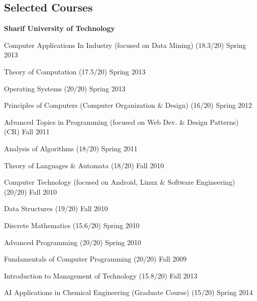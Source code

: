 \documentclass[margin,line]{resume}
\begin{document}
\begin{resume}
     \section{\mysidestyle Selected Courses} 
     {\bf Sharif University of Technology}
     \begin{list2}
        \vspace*{1mm}
        \item Computer Applications In Industry (focused on Data Mining) (18.3/20) \hfill {\sf Spring 2013}
        \item Theory of Computation (17.5/20) \hfill {\sf Spring 2013}
        \item Operating Systems (20/20) \hfill {\sf Spring 2013}
        \item Principles of Computers (Computer Organization \& Design) (16/20) \hfill {\sf Spring 2012}
        \item Advanced Topics in Programming (focused on Web Dev. \& Design Patterns) (CR) \hfill {\sf Fall 2011}
        \item Analysis of Algorithms (18/20) \hfill {\sf Spring 2011}
        \item Theory of Languages \& Automata (18/20) \hfill {\sf Fall 2010}
        \item Computer Technology (focused on Android, Linux \& Software Engineering) (20/20) \hfill {\sf Fall 2010}
        \item Data Structures (19/20) \hfill {\sf Fall 2010}
        \item Discrete Mathematics (15.6/20) \hfill {\sf Spring 2010}
        \item Advanced Programming (20/20) \hfill {\sf Spring 2010}
        \item Fundamentals of Computer Programming (20/20) \hfill {\sf Fall 2009}
        \item Introduction to Management of Technology (15.8/20) \hfill {\sf Fall 2013}
        \item AI Applications in Chemical Engineering (Graduate Course) (15/20) \hfill {\sf Spring 2014}
    \end{list2}


\end{resume}
\end{document}
